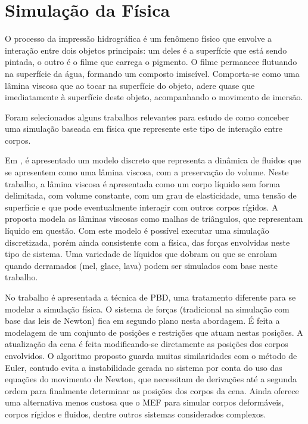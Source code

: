 
\acresetall 

\section{Simulação da Física}

O processo da impressão hidrográfica é um fenômeno físico que envolve a interação entre dois objetos principais: um deles é a superfície que está sendo pintada, o outro é o filme que carrega o pigmento. O filme permanece flutuando na superfície da água, formando um composto imiscível. Comporta-se como uma lâmina viscosa que ao tocar na superfície do objeto, adere quase que imediatamente à superfície deste objeto, acompanhando o movimento de imersão.

Foram selecionados alguns trabalhos relevantes para estudo de como conceber uma simulação baseada em física que represente este tipo de interação entre corpos.

Em \cite{Batty2012}, é apresentado um modelo discreto que representa a dinâmica de fluidos que se apresentem como uma lâmina viscosa, com a preservação do volume. Neste trabalho, a lâmina viscosa é apresentada como um corpo líquido sem forma delimitada, com volume constante, com um grau de elasticidade, uma tensão de superfície e que pode eventualmente interagir com outros corpos rígidos. A proposta modela as lâminas viscosas como malhas de triângulos, que representam líquido em questão. Com este modelo é possível executar uma simulação discretizada, porém ainda consistente com a física, das forças envolvidas neste tipo de sistema. Uma variedade de líquidos que dobram ou que se enrolam quando derramados (mel, glace, lava) podem ser simulados com base neste trabalho.

No trabalho \cite{muller2007position} é apresentada a técnica de \ac{PBD}, uma tratamento diferente para se modelar a simulação física. O sistema de forças (tradicional na simulação com base das leis de Newton) fica em segundo plano nesta abordagem. É feita a modelagem de um conjunto de posições e restrições que atuam nestas posições. A atualização da cena é feita modificando-se diretamente as posições dos corpos envolvidos. O algoritmo proposto guarda muitas similaridades com o método de Euler, contudo evita a instabilidade gerada no sistema por conta do uso das equações do movimento de Newton, que necessitam de derivações até a segunda ordem para finalmente determinar as posições dos corpos da cena. Ainda oferece uma alternativa menos custosa que o \ac{MEF} para simular corpos deformáveis, corpos rígidos e fluidos, dentre outros sistemas considerados complexos.

